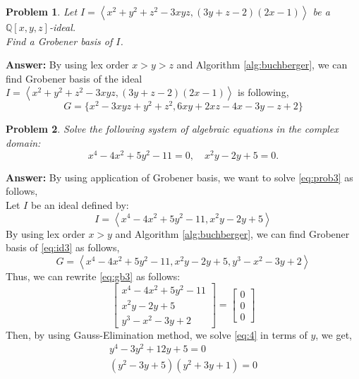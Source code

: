 \documentclass[a4paper,12pt]{article}
\newtheorem{prob}{Problem}[]
\theoremstyle{definition}
\newcommand{\Q}{\mathbb{Q}}
\begin{document}
\newpage
\begin{prob}
	Let $I=\left< x^2+y^2+z^2-3xyz, (3y+z-2)(2x-1) \right>$ be a $\Q[x,y,z]$-ideal.\\ Find a Grobener basis of $I$.
\end{prob}
\textbf{Answer:}
By using lex order $x>y>z$ and Algorithm \ref{alg:buchberger}, we can find Grobener basis of the ideal $I=\left< x^2+y^2+z^2-3xyz, (3y+z-2)(2x-1) \right>$ is following,
\begin{equation*}
G = \{x^2-3xyz+y^2+z^2, 6xy+2xz-4x-3y-z+2\}
\end{equation*}

\begin{prob}
	Solve the following system of algebraic equations in the complex domain:
	\begin{equation}\label{eq:prob3}
	x^4-4x^2+5y^2-11=0, \quad x^2y-2y+5=0.
	\end{equation}
\end{prob}
\textbf{Answer:}
By using application of Grobener basis, we want to solve \eqref{eq:prob3} as follows,\\
Let $I$ be an ideal defined by:
\begin{equation}\label{eq:id3}
I = \left< x^4-4x^2+5y^2-11, x^2y-2y+5 \right>
\end{equation}
By using lex order $x>y$ and Algorithm \ref{alg:buchberger}, we can find Grobener basis of \eqref{eq:id3} as follows,
\begin{equation}\label{eq:gb3}
G = \left< x^4-4x^2+5y^2-11, x^2y-2y+5, y^3-x^2-3y+2 \right>
\end{equation}
Thus, we can rewrite \eqref{eq:gb3} as follows:
\begin{equation}\label{eq:4}
\left[ \begin{array}{l}
x^4-4x^2+5y^2-11\\
x^2y-2y+5\\
y^3-x^2-3y+2
\end{array}\right] = \left[ \begin{array}{c}
0\\
0\\
0
\end{array}\right]
\end{equation}
Then, by using Gauss-Elimination method, we solve \eqref{eq:4} in terms of $y$, we get,
\begin{equation}\label{eq:5}
\begin{aligned}
y^4-3y^2+12y+5 = 0\\
(y^2-3y+5)(y^2+3y+1)=0
\end{aligned}
\end{equation}
\end{document}
